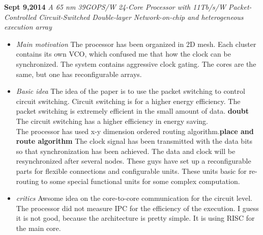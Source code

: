\documentclass[]{article}
\begin{document}
\noindent \textbf{Sept 9,2014}
\textit{A 65 nm 39GOPS/W 24-Core Processor with 11Tb/s/W Packet-Controlled Circuit-Switched Double-layer Network-on-chip and heterogeneous execution array}
\indent		\begin{itemize}
            \item \textit{Main motivation} The processor has been organized in 2D mesh.
            Each cluster contains its own VCO, which confused me that how the clock can be synchronized.
            The system contains aggressive clock gating. The cores are the same, but one has reconfigurable arrays.

            \item \textit{Basic idea} The idea of the paper is to use the packet switching to control circuit switching.
            Circuit switching is for a higher energy efficiency.
            The packet switching is extremely efficient in the small amount of data. \textbf{doubt}
            The circuit switching has a higher efficiency in energy saving.\\

            The processor has used x-y dimension ordered routing algorithm.\textbf{place and route algorithm}
            The clock signal has been transmitted with the data bits so that synchronization has been achieved.
            The data and clock will be resynchronized after several nodes.
            These guys have set up a reconfigurable parts for flexible connections and configurable units.
            These units basic for re-routing to some special functional units for some complex computation.

            \item \textit{critics} Awsome idea on the core-to-core communication for the circuit level.
            The processor did not measure IPC for the efficiency of the execution.
            I guess it is not good, because the architecture is pretty simple.
            It is using RISC for the main core.



            \end{itemize}
\end{document}
